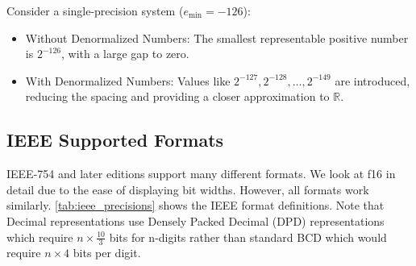 Consider a single-precision system (\( e_{\text{min}} = -126 \)):
\begin{itemize}[noitemsep]
    \item Without Denormalized Numbers: The smallest representable positive number is \( 2^{-126} \), with a large gap to zero.
    \item With Denormalized Numbers: Values like \( 2^{-127}, 2^{-128}, \dots, 2^{-149} \) are introduced, reducing the spacing and providing a closer approximation to \( \mathbb{R} \).
\end{itemize}

\subsection{IEEE Supported Formats}
IEEE-754 and later editions support many different formats. We look at f16 in detail due to the ease of displaying bit widths. However, all formats work similarly. \ref{tab:ieee_precisions} shows the IEEE format definitions. Note that Decimal representations use Densely Packed Decimal (DPD) representations which require $n \times \frac{10}{3}$ bits for n-digits rather than standard BCD which would require $n \times 4$ bits per digit.

